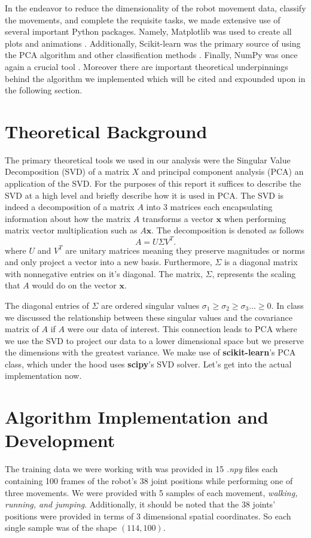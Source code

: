 \documentclass[11pt]{amsart}
\begin{document}
In the endeavor to reduce the dimensionality of the robot movement data, classify the movements, and complete the requisite tasks, we made extensive use of several important Python packages.
Namely, Matplotlib was used to create all plots and animations \cite{Hunter:2007}.
Additionally, Scikit-learn was the primary source of using the PCA algorithm and other classification methods \cite{scikit-learn}. 
Finally, NumPy was once again a crucial tool \cite{harris2020array}.
Moreover there are important theoretical underpinnings behind the algorithm we implemented which will be cited and expounded upon in the following section.

\section{Theoretical Background}\label{sec:theory}
The primary theoretical tools we used in our analysis were the Singular Value Decomposition (SVD) of a matrix $X$ and principal component analysis (PCA) an application of the SVD.
For the purposes of this report it suffices to describe the SVD at a high level and briefly describe how it is used in PCA.
The SVD is indeed a decomposition of a matrix $A$ into 3 matrices each encapsulating information about how the matrix $A$ transforms a vector $\bm x$ when performing matrix vector multiplication such as $A \bm x$.
The decomposition is denoted as follows
\begin{equation}
A = U\Sigma V^T.
\label{eq:svd}
\end{equation}
where $U$ and $V^T$ are unitary matrices meaning they preserve magnitudes or norms and only project a vector into a new basis.
Furthermore, $\Sigma$ is a diagonal matrix with nonnegative entries on it's diagonal.
The matrix, $\Sigma$, represents the scaling that $A$ would do on the vector $\bm x$.

The diagonal entries of $\Sigma$ are ordered singular values $\sigma_1 \geq \sigma_2 \geq \sigma_3 ... \geq 0$.
In class we discussed the relationship between these singular values and the covariance matrix of $A$ if $A$ were our data of interest.
This connection leads to PCA where we use the SVD to project our data to a lower dimensional space but we preserve the dimensions with the greatest variance.
We make use of \textbf{ scikit-learn}'s PCA class, which under the hood uses \textbf{scipy}'s SVD solver.
Let's get into the actual implementation now.

\section{Algorithm Implementation and Development}\label{sec:algorithms}
The training data we were working with was provided in 15 \textit{.npy } files each containing 100 frames of the robot's 38 joint positions while performing one of three movements.
We were provided with 5 samples of each movement, \textit{walking, running, {\rm and } jumping}.
Additionally, it should be noted that the 38 joints' positions were provided in terms of 3 dimensional spatial coordinates.
So each single sample was of the shape $(114,100)$.
\end{document}
